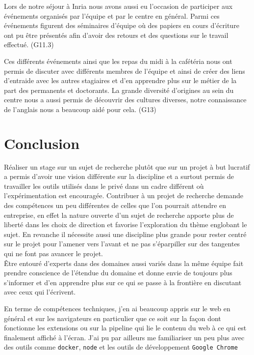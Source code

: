 \documentclass[oneside,a4paper,12pt]{article}
\begin{document}
Lors de notre séjour à Inria nous avons aussi eu l'occasion de participer aux événements organisés par l'équipe et par le centre en général. Parmi ces événements figurent des séminaires d'équipe où des papiers en cours d'écriture ont pu être présentés afin d'avoir des retours et des questions sur le travail effectué. (G11.3)

Ces différents événements ainsi que les repas du midi à la cafétéria nous ont permis de discuter avec différents membres de l'équipe et ainsi de créer des liens d'entraide avec les autres stagiaires et d'en apprendre plus sur le métier de la part des permanents et doctorants. La grande diversité d'origines au sein du centre nous a aussi permis de découvrir des cultures diverses, notre connaissance de l'anglais nous a beaucoup aidé pour cela. (G13)

\newpage

\section{Conclusion}

Réaliser un stage sur un sujet de recherche plutôt que sur un projet à but lucratif a permis d'avoir une vision différente sur la discipline et a surtout permis de travailler les outils utilisés dans le privé dans un cadre différent où l'expérimentation est encouragée. Contribuer à un projet de recherche demande des compétences un peu différentes de celles que l'on pourrait attendre en entreprise, en effet la nature ouverte d'un sujet de recherche apporte plus de liberté dans les choix de direction et favorise l'exploration du thème englobant le sujet. En revanche il nécessite aussi une discipline plus grande pour rester centré sur le projet pour l'amener vers l'avant et ne pas s'éparpiller sur des tangentes qui ne font pas avancer le projet.\\

\^Etre entouré d'experts dans des domaines aussi variés dans la m\^eme \'equipe fait prendre conscience de l'\'etendue du domaine et donne envie de toujours plus s'informer et d'en apprendre plus sur ce qui se passe à la frontière en discutant avec ceux qui l'\'ecrivent.

En terme de comp\'etences techniques, j'en ai beaucoup appris sur le web en général et sur les navigateurs en particulier que ce soit sur la fa\c{c}on dont fonctionne les extensions ou sur la pipeline qui lie le contenu du web à ce qui est finalement affiché à l'écran. J'ai pu par ailleurs me familiariser un peu plus avec des outils comme \texttt{docker}, \texttt{node} et les outils de développement \texttt{Google Chrome}
\end{document}
